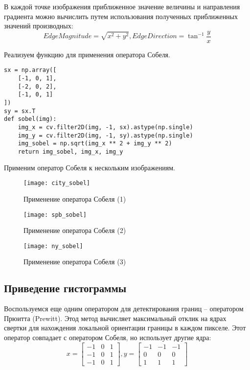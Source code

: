 {В каждой точке изображения приближенное значение величины и направления градиента можно вычислить путем использования полученных приближенных значений производных:
$$
Edge Magnitude = \sqrt{x^2 + y^2}, Edge Direction = \tan^{-1}\frac{y}{x}
$$

Реализуем функцию для применения оператора Собеля.

\begin{lstlisting}[caption={Применение оператора Собеля}]
sx = np.array([
    [-1, 0, 1],
    [-2, 0, 2],
    [-1, 0, 1]
])
sy = sx.T
def sobel(img):
    img_x = cv.filter2D(img, -1, sx).astype(np.single)
    img_y = cv.filter2D(img, -1, sy).astype(np.single)
    img_sobel = np.sqrt(img_x ** 2 + img_y ** 2)
    return img_sobel, img_x, img_y
\end{lstlisting}

Применим оператор Собеля к нескольким изображениям.

\begin{figure}[H]
	\centering
	\texttt{[image: city\_sobel]}
	\caption{Применение оператора Собеля (1)}
\end{figure}

\begin{figure}[H]
	\centering
	\texttt{[image: spb\_sobel]}
	\caption{Применение оператора Собеля (2)}
\end{figure}

\begin{figure}[H]
	\centering
	\texttt{[image: ny\_sobel]}
	\caption{Применение оператора Собеля (3)}
\end{figure}

\subsection{Приведение гистограммы}

Воспользуемся еще одним оператором для детектирования границ -- оператором Прюитта (Prewitt). Этод метод вычисляет максимальный отклик на ядрах свертки для нахождения локальной ориентации границы в каждом пикселе. Этот оператор совпадает с оператором Собеля, но использует другие ядра:
$$
x = \begin{bmatrix}
-1 & 0 & 1 \\
-1 & 0 & 1 \\
-1 & 0 & 1
\end{bmatrix},
y = \begin{bmatrix}
-1 & -1 & -1 \\
0  & 0  & 0 \\
1  & 1  & 1
\end{bmatrix}
$$

}
